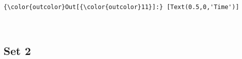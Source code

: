 \documentclass[11pt]{article}
\begin{document}
\begin{Verbatim}[commandchars=\\\{\}]
{\color{outcolor}Out[{\color{outcolor}11}]:} [Text(0.5,0,'Time')]
\end{Verbatim}
            
    \begin{center}
    \end{center}
    { \hspace*{\fill} \\}
    
    \subsection{Set 2}\label{set-2}
\end{document}
